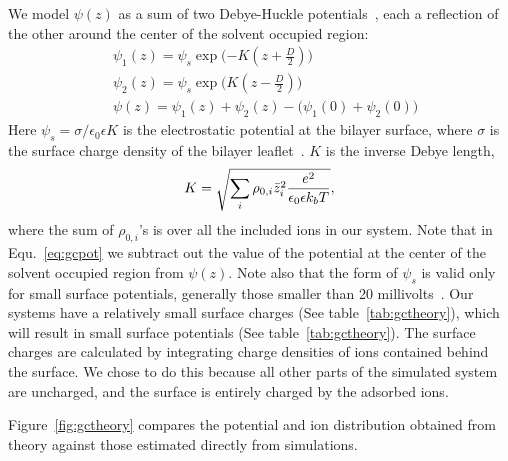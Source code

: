 \documentclass[12pt,openany,final]{book}
\begin{document}
We model $\psi(z)$ as a sum of two Debye-Huckle 
potentials~\cite{israelachvili:2011:intermol}, each a reflection of the other around the center of the solvent occupied region:
\begin{align}
&\psi_{1}(z) = \psi_s \exp\bigg({-K(z+\frac{D}{2})}\bigg)\\
&\psi_{2}(z) = \psi_s \exp\bigg({K(z-\frac{D}{2})}\bigg)\\
\label{eq:gcpot}
&\psi(z) = \psi_1(z) + \psi_2(z) - \big({\psi_1(0)+\psi_2(0)}\big)
\end{align}
Here $\psi_s = \sigma/\epsilon_0\epsilon K$ is the electrostatic potential at the bilayer surface, where $\sigma$ 
is the surface charge density of the bilayer leaflet~\cite{israelachvili:2011:intermol}. $K$ is the inverse Debye length, 
\begin{equation}
\label{eq:debyelength}
K=\sqrt{\sum_{i} \rho_{0,i} \bar z_i^2\frac{\text{\si{\elementarycharge}}^2}{\epsilon_0 \epsilon k_bT}},
\end{equation}
where the sum of $\rho_{0,i}$'s is over all the included ions in our system. Note that in Equ.~\ref{eq:gcpot} we 
subtract out the value of the potential at the center of the solvent occupied region from $\psi(z)$. 
Note also that the form of $\psi_s$ is valid only for small surface potentials, generally those smaller than 
20 millivolts~\cite{israelachvili:2011:intermol}. Our systems have a relatively small surface charges 
(See table~\ref{tab:gctheory}), 
which will result in small surface potentials (See table~\ref{tab:gctheory}). 
The surface charges are calculated by integrating 
charge densities of ions contained behind the surface. We chose to do this because all other parts of 
the simulated system are uncharged, and the surface is entirely charged by the adsorbed ions.

Figure~\ref{fig:gctheory} compares the potential and ion distribution 
obtained from theory against those estimated directly from simulations. 
\end{document}
